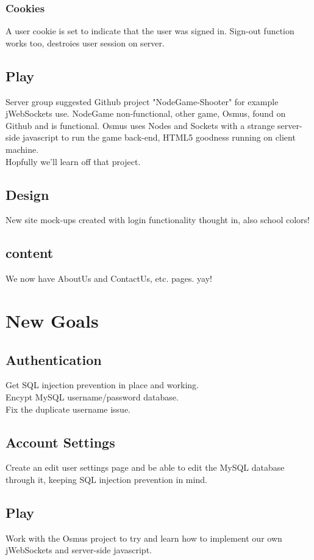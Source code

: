 		\subsubsection{Cookies}
		A user cookie is set to indicate that the user was signed in. Sign-out function works too, destroies user session on server.
	\subsection{Play}
	Server group suggested Github project "NodeGame-Shooter" for example jWebSockets use. NodeGame non-functional, other game, Osmus, found on Github and is functional. Osmus uses Nodes and Sockets with a strange server-side javascript to run the game back-end, HTML5 goodness running on client machine.\\Hopfully we'll learn off that project.
	\subsection{Design}
	New site mock-ups created with login functionality thought in, also school colors! 
	\subsection{content}
	We now have AboutUs and ContactUs, etc. pages. yay!

\section{New Goals}
	\subsection{Authentication}
	Get SQL injection prevention in place and working.\\Encypt MySQL username/password database.\\Fix the duplicate username issue. 
	\subsection{Account Settings}
	Create an edit user settings page and be able to edit the MySQL database through it, keeping SQL injection prevention in mind.
	\subsection{Play}
	Work with the Osmus project to try and learn how to implement our own jWebSockets and server-side javascript.
